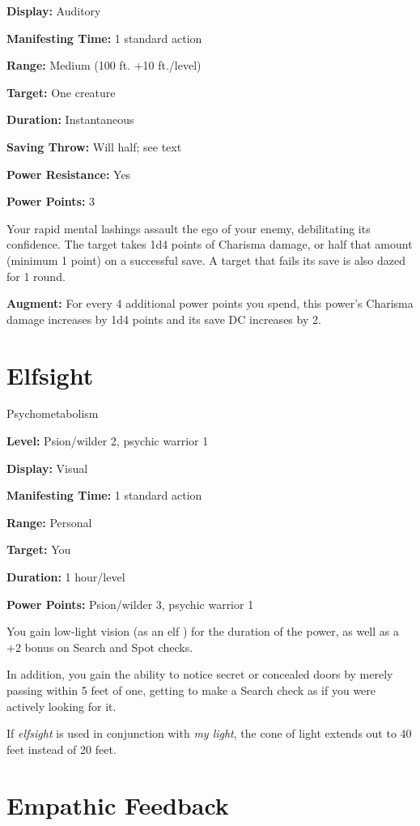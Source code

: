 \documentclass{article}
\begin{document}
\textbf{Display:} Auditory

\textbf{Manifesting Time:} 1 standard action

\textbf{Range:} Medium (100 ft. +10 ft./level)

\textbf{Target:} One creature

\textbf{Duration:} Instantaneous

\textbf{Saving Throw:} Will half; see text

\textbf{Power Resistance:} Yes

\textbf{Power Points:} 3

Your rapid mental lashings assault the ego of your enemy, debilitating its confidence. 
The target takes 1d4 points of Charisma damage, or half that amount (minimum 1 
point) on a successful save. A target that fails its save is also dazed for 1 round.

\textbf{Augment:} For every 4 additional power points you spend, this power's Charisma 
damage increases by 1d4 points and its save DC increases by 2.

\vspace{12pt}
\section*{Elfsight}

Psychometabolism

\textbf{Level:} Psion/wilder 2, psychic warrior 1

\textbf{Display:} Visual

\textbf{Manifesting Time:} 1 standard action

\textbf{Range:} Personal

\textbf{Target:} You

\textbf{Duration:} 1 hour/level

\textbf{Power Points:} Psion/wilder 3, psychic warrior 1

You gain low-light vision (as an elf ) for the duration of the power, as well as 
a +2 bonus on Search and Spot checks.

In addition, you gain the ability to notice secret or concealed doors by merely 
passing within 5 feet of one, getting to make a Search check as if you were actively 
looking for it.

If \textit{elfsight }is used in conjunction with \textit{my light}, the cone of 
light extends out to 40 feet instead of 20 feet.

\vspace{12pt}
\section*{Empathic Feedback}
\end{document}
